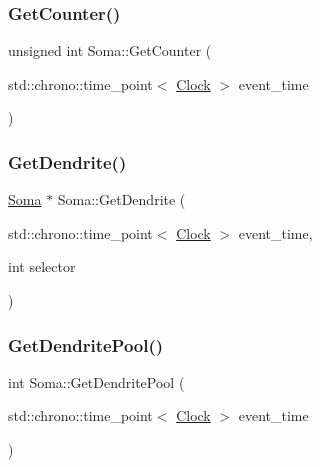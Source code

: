 \mbox{\label{classSoma_a8bac091792e1ac47655bb549510e8960}} 
\subsubsection{\texorpdfstring{Get\+Counter()}{GetCounter()}}
{\footnotesize\ttfamily unsigned int Soma\+::\+Get\+Counter (\begin{DoxyParamCaption}\item[{std\+::chrono\+::time\+\_\+point$<$ \mbox{\hyperlink{universe_8h_a0ef8d951d1ca5ab3cfaf7ab4c7a6fd80}{Clock}} $>$}]{event\+\_\+time }\end{DoxyParamCaption})\hspace{0.3cm}{\ttfamily [inline]}}

\mbox{\label{classSoma_ab86537170d550cda0e7da080f7640f84}} 
\subsubsection{\texorpdfstring{Get\+Dendrite()}{GetDendrite()}}
{\footnotesize\ttfamily \mbox{\hyperlink{classSoma}{Soma}} $\ast$ Soma\+::\+Get\+Dendrite (\begin{DoxyParamCaption}\item[{std\+::chrono\+::time\+\_\+point$<$ \mbox{\hyperlink{universe_8h_a0ef8d951d1ca5ab3cfaf7ab4c7a6fd80}{Clock}} $>$}]{event\+\_\+time,  }\item[{int}]{selector }\end{DoxyParamCaption})}

\mbox{\label{classSoma_a000d9eca00c61af853fd81a2c1569b0e}} 
\subsubsection{\texorpdfstring{Get\+Dendrite\+Pool()}{GetDendritePool()}}
{\footnotesize\ttfamily int Soma\+::\+Get\+Dendrite\+Pool (\begin{DoxyParamCaption}\item[{std\+::chrono\+::time\+\_\+point$<$ \mbox{\hyperlink{universe_8h_a0ef8d951d1ca5ab3cfaf7ab4c7a6fd80}{Clock}} $>$}]{event\+\_\+time }\end{DoxyParamCaption})\hspace{0.3cm}{\ttfamily [inline]}}

